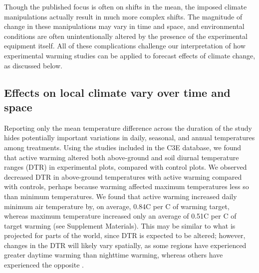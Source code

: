 \documentclass{article}
\begin{document}
\par Though the published focus is often on shifts in the mean, the imposed climate manipulations actually result in much more complex shifts. The magnitude of change in these manipulations may vary in time and space, and environmental conditions are often unintentionally altered by the presence of the experimental equipment itself. All of these complications challenge our interpretation of how experimental warming studies can be applied to forecast effects of climate change, as discussed below.

\subsection* {Effects on local climate vary over time and space}
Reporting only the mean temperature difference across the duration of the study hides potentially important variations in daily, seasonal, and annual temperatures among treatments. Using the studies included in the C3E database, we found that active warming altered both above-ground and soil diurnal temperature ranges (DTR) in experimental plots, compared with control plots. We observed decreased DTR in above-ground temperatures with active warming compared with controls, perhaps because warming affected maximum temperatures less so than minimum temperatures. We found that active warming increased daily minimum air temperature by, on average, 0.84\degree C per \degree C of warming target, whereas maximum temperature increased only an average of 0.51\degree C per \degree C of target warming (see Supplement Materials). This may be similar to what is projected for parts of the world, since DTR is expected to be altered; however, changes in the DTR will likely vary spatially, as some regions have experienced greater daytime warming than nighttime warming, whereas others have experienced the opposite \citep{ipcc2013}. 
\end{document}

